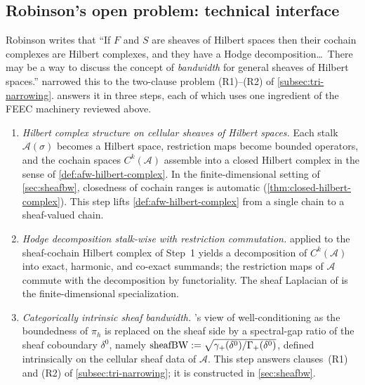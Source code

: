 \subsection{Robinson's open problem: technical interface}\label{subsec:feec-robinson-interface}

Robinson \cite[\S 6]{Robinson2014} writes that ``If $F$ and $S$ are
sheaves of Hilbert spaces then their cochain complexes are Hilbert
complexes, and they have a Hodge decomposition\ldots\ There may be
a way to discuss the concept of \emph{bandwidth} for general sheaves
of Hilbert spaces.'' 
narrowed this to the two-clause problem
\textup{(R1)}--\textup{(R2)} of \cref{subsec:tri-narrowing}.
 answers it in three steps, each of which uses one
ingredient of the FEEC machinery reviewed above.

\begin{enumerate}
  \item[\textbf{Step 1:}] \emph{Hilbert complex structure on cellular
        sheaves of Hilbert spaces.} Each stalk
        $\mathscr{A}(\sigma)$ becomes a Hilbert space, restriction
        maps become bounded operators, and the cochain spaces
        $C^k(\mathscr{A})$ assemble into a closed Hilbert complex
        in the sense of \cref{def:afw-hilbert-complex}. In the
        finite-dimensional setting of \cref{sec:sheafbw}, closedness
        of cochain ranges is automatic
        (\cref{thm:closed-hilbert-complex}). This step lifts
        \cref{def:afw-hilbert-complex} from a single chain to a
        sheaf-valued chain.
  \item[\textbf{Step 2:}] \emph{Hodge decomposition stalk-wise with
        restriction commutation.}  applied to
        the sheaf-cochain Hilbert complex of Step~1 yields a
        decomposition of $C^k(\mathscr{A})$ into exact, harmonic,
        and co-exact summands; the restriction maps of $\mathscr{A}$
        commute with the decomposition by functoriality. The
        sheaf Laplacian of \cite{HansenGhrist2019} is the
        finite-dimensional specialization.
  \item[\textbf{Step 3:}] \emph{Categorically intrinsic sheaf
        bandwidth.} 's view of
        well-conditioning as the boundedness of $\pi_h$ is replaced
        on the sheaf side by a spectral-gap ratio of the sheaf
        coboundary $\delta^0$, namely
        $\operatorname{sheafBW} := \sqrt{\gamma_+(\delta^0) /
        \Gamma_+(\delta^0)}$, defined intrinsically on the cellular
        sheaf data of $\mathscr{A}$. This step answers
        clauses~\textup{(R1)} and \textup{(R2)} of
        \cref{subsec:tri-narrowing}; it is constructed in
        \cref{sec:sheafbw}.
\end{enumerate}

